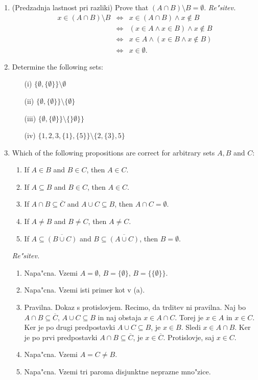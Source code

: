 \documentclass[11pt,paper=b5,footinclude,headinclude]{scrbook} %
\theoremstyle{remark}
\theoremstyle{definition} %
\theoremstyle{theorem} %
\begin{document}
\begin{enumerate}
\item (Predzadnja lastnost pri razliki) Prove that $(A\cap B )\setminus B = \emptyset$.
\emph{ Re"sitev.} 
\begin{eqnarray*}
x\in (A\cap B )\setminus B  &\Leftrightarrow & x \in (A\cap B)  \wedge x\notin B\\
&\Leftrightarrow & (x\in A\wedge x\in  B ) \wedge x\notin B\\
&\Leftrightarrow & x\in A\wedge (x\in  B  \wedge x\notin B)\\
&\Leftrightarrow & x\in \emptyset.
\end{eqnarray*}

\item Determine the following sets:
\begin{enumerate}
\item[(i)] $\{\emptyset, \{\emptyset\}\}\setminus \emptyset$ \quad [$\{\emptyset, \{\emptyset\}\}$]
\item[(ii)] $\{\emptyset, \{\emptyset\}\}\setminus \{\emptyset\}$
\item[(iii)] $\{\emptyset, \{\emptyset\}\}\setminus \{\}\emptyset\}\}$
\item[(iv)] $\{1,2,3,\{1\}, \{5\}  \}\setminus \{2,\{3\},5\}$
\end{enumerate}

\item Which of the following propositions are correct for arbitrary sets $A, B$ and $C$:
\begin{enumerate}
\item If $A\in B$ and $B\in C$, then $A\in C$.
\item If $A\subseteq B$ and $B\in C$, then $A\in C$.
\item If $A\cap B\subseteq \overline{C}$ and $A\cup C \subseteq B$, then $A\cap C = \emptyset$.
\item If $A\neq B$ and $B\neq C$, then $A\neq C$.
\item If $A\subseteq \overline{(B\cup C)}$ and $B\subseteq \overline{(A\cup C)}$, then $B=\emptyset$.
\end{enumerate}

\emph{ Re"sitev.}
\begin{enumerate}
\item Napa"cna. Vzemi $A=\emptyset$, $B=\{\emptyset\}$, $B=\{\{\emptyset\}\}$.
\item Napa"cna. Vzemi isti primer kot v (a).
\item Pravilna. Dokaz s protislovjem. Recimo, da trditev ni pravilna. Naj bo $A\cap B\subseteq \overline{C}$, $A\cup C\subseteq B$  in naj obstaja $x\in A\cap C$. Torej je $x\in A$ in $x\in C$. Ker je po drugi predpostavki $A\cup C\subseteq B$, je $x\in B$. Sledi $x\in A \cap B$. Ker je po prvi predpostavki $A\cap B\subseteq \overline{C}$, je $x\in \overline{C}$. Protislovje, saj $x\in C$. 
\item Napa"cna. Vzemi $A=C\neq B$.
\item Napa"cna. Vzemi tri paroma disjunktne neprazne mno"zice.
\end{enumerate}

\end{enumerate}
\end{document}
